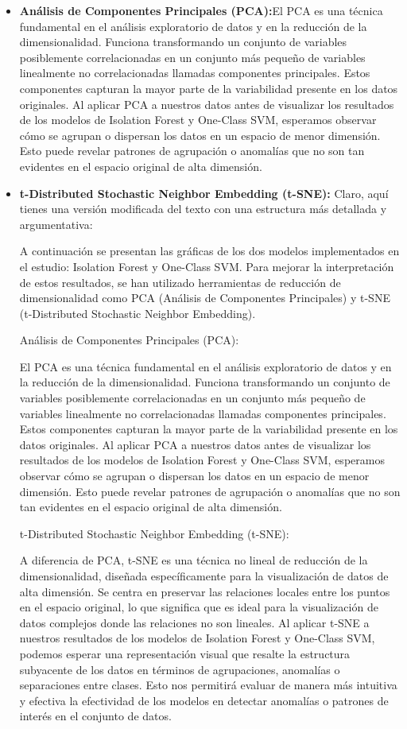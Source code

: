\begin{itemize}
	\item {\textbf{Análisis de Componentes Principales (PCA):}}El PCA es una técnica fundamental en el análisis exploratorio de datos y en la reducción de la dimensionalidad. Funciona transformando un conjunto de variables posiblemente correlacionadas en un conjunto más pequeño de variables linealmente no correlacionadas llamadas componentes principales. Estos componentes capturan la mayor parte de la variabilidad presente en los datos originales. Al aplicar PCA a nuestros datos antes de visualizar los resultados de los modelos de Isolation Forest y One-Class SVM, esperamos observar cómo se agrupan o dispersan los datos en un espacio de menor dimensión. Esto puede revelar patrones de agrupación o anomalías que no son tan evidentes en el espacio original de alta dimensión.
	
	\item {\textbf{t-Distributed Stochastic Neighbor Embedding (t-SNE):}} 
Claro, aquí tienes una versión modificada del texto con una estructura más detallada y argumentativa:

A continuación se presentan las gráficas de los dos modelos implementados en el estudio: Isolation Forest y One-Class SVM. Para mejorar la interpretación de estos resultados, se han utilizado herramientas de reducción de dimensionalidad como PCA (Análisis de Componentes Principales) y t-SNE (t-Distributed Stochastic Neighbor Embedding).

Análisis de Componentes Principales (PCA):

El PCA es una técnica fundamental en el análisis exploratorio de datos y en la reducción de la dimensionalidad. Funciona transformando un conjunto de variables posiblemente correlacionadas en un conjunto más pequeño de variables linealmente no correlacionadas llamadas componentes principales. Estos componentes capturan la mayor parte de la variabilidad presente en los datos originales. Al aplicar PCA a nuestros datos antes de visualizar los resultados de los modelos de Isolation Forest y One-Class SVM, esperamos observar cómo se agrupan o dispersan los datos en un espacio de menor dimensión. Esto puede revelar patrones de agrupación o anomalías que no son tan evidentes en el espacio original de alta dimensión.

t-Distributed Stochastic Neighbor Embedding (t-SNE):

A diferencia de PCA, t-SNE es una técnica no lineal de reducción de la dimensionalidad, diseñada específicamente para la visualización de datos de alta dimensión. Se centra en preservar las relaciones locales entre los puntos en el espacio original, lo que significa que es ideal para la visualización de datos complejos donde las relaciones no son lineales. Al aplicar t-SNE a nuestros resultados de los modelos de Isolation Forest y One-Class SVM, podemos esperar una representación visual que resalte la estructura subyacente de los datos en términos de agrupaciones, anomalías o separaciones entre clases. Esto nos permitirá evaluar de manera más intuitiva y efectiva la efectividad de los modelos en detectar anomalías o patrones de interés en el conjunto de datos.
\end{itemize}

